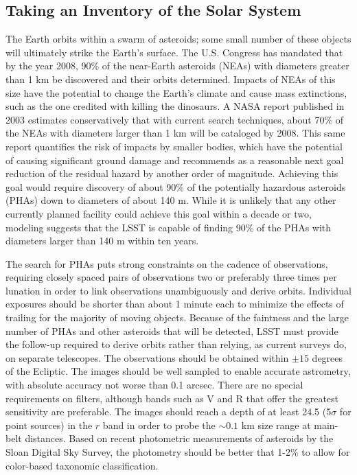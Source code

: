 \subsection{Taking an Inventory of the Solar System}

The Earth orbits within a swarm of asteroids; some small number of these
objects will ultimately strike the Earth's surface. The U.S. Congress has
mandated that by the year 2008, 90\% of the near-Earth asteroids (NEAs)
with diameters greater than 1 km be discovered and their orbits
determined. Impacts of NEAs of this size have the potential to change the
Earth's climate and cause mass extinctions, such as the one credited with
killing the dinosaurs. A NASA report published in 2003 estimates
conservatively that with current search techniques, about 70\% of the NEAs
with diameters larger than 1 km will be cataloged by 2008. This same report
quantifies the risk of impacts by smaller bodies, which have the potential
of causing significant ground damage and recommends as a reasonable next
goal reduction of the residual hazard by another order of
magnitude. Achieving this goal would require discovery of about 90\% of the
potentially hazardous asteroids (PHAs) down to diameters of about 140
m. While it is unlikely that any other currently planned facility could achieve
this goal within a decade or two, modeling suggests that the LSST is capable
of finding 90\% of the PHAs with diameters larger than 140 m within ten
years.

The search for PHAs puts strong constraints on the cadence of observations,
requiring closely spaced pairs of observations two or preferably three
times per lunation in order to link observations unambiguously and derive
orbits. Individual exposures should be shorter than about 1 minute each to
minimize the effects of trailing for the majority of moving
objects. Because of the faintness and the large number of PHAs and other
asteroids that will be detected, LSST must provide the follow-up required
to derive orbits rather than relying, as current surveys do, on separate
telescopes. The observations should be obtained within $\pm15$ degrees of
the Ecliptic.  The images should be well sampled to enable accurate
astrometry, with absolute accuracy not worse than 0.1 arcsec. There are no
special requirements on filters, although bands such as V and R that offer
the greatest sensitivity are preferable.  The images should reach a depth
of at least 24.5 (5$\sigma$ for point sources) in the $r$ band in order to
probe the $\sim0.1$ km size range at main-belt distances. Based on recent
photometric measurements of asteroids by the Sloan Digital Sky Survey, the
photometry should be better that 1-2\% to allow for color-based taxonomic
classification.

